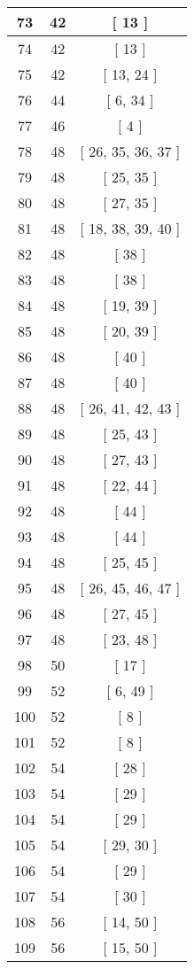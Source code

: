 \begin{center}
\begin{longtable}[H]{|| c c c ||}
\hline
73 & 42 & [ 13 ] \\ 
\hline
74 & 42 & [ 13 ] \\ 
\hline
75 & 42 & [ 13, 24 ] \\ 
\hline
76 & 44 & [ 6, 34 ] \\ 
\hline
77 & 46 & [ 4 ] \\ 
\hline
78 & 48 & [ 26, 35, 36, 37 ] \\ 
\hline
79 & 48 & [ 25, 35 ] \\ 
\hline
80 & 48 & [ 27, 35 ] \\ 
\hline
81 & 48 & [ 18, 38, 39, 40 ] \\ 
\hline
82 & 48 & [ 38 ] \\ 
\hline
83 & 48 & [ 38 ] \\ 
\hline
84 & 48 & [ 19, 39 ] \\ 
\hline
85 & 48 & [ 20, 39 ] \\ 
\hline
86 & 48 & [ 40 ] \\ 
\hline
87 & 48 & [ 40 ] \\ 
\hline
88 & 48 & [ 26, 41, 42, 43 ] \\ 
\hline
89 & 48 & [ 25, 43 ] \\ 
\hline
90 & 48 & [ 27, 43 ] \\ 
\hline
91 & 48 & [ 22, 44 ] \\ 
\hline
92 & 48 & [ 44 ] \\ 
\hline
93 & 48 & [ 44 ] \\ 
\hline
94 & 48 & [ 25, 45 ] \\ 
\hline
95 & 48 & [ 26, 45, 46, 47 ] \\ 
\hline
96 & 48 & [ 27, 45 ] \\ 
\hline
97 & 48 & [ 23, 48 ] \\ 
\hline
98 & 50 & [ 17 ] \\ 
\hline
99 & 52 & [ 6, 49 ] \\ 
\hline
100 & 52 & [ 8 ] \\ 
\hline
101 & 52 & [ 8 ] \\ 
\hline
102 & 54 & [ 28 ] \\ 
\hline
103 & 54 & [ 29 ] \\ 
\hline
104 & 54 & [ 29 ] \\ 
\hline
105 & 54 & [ 29, 30 ] \\ 
\hline
106 & 54 & [ 29 ] \\ 
\hline
107 & 54 & [ 30 ] \\ 
\hline
108 & 56 & [ 14, 50 ] \\ 
\hline
109 & 56 & [ 15, 50 ] \\ 

\end{longtable}
\end{center}
